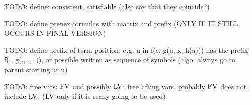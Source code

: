 TODO: define: consistent, satisfiable (also say that they coincide?)

TODO: define prenex formulas with matrix and prefix (ONLY IF IT STILL OCCURS IN FINAL VERSION)

TODO: define prefix of term position: e.g. u in f(c, g(u, x, h(a))) has the prefix f(., g(., ., .)), or possible written as sequence of symbols (algo: always go to parent starting at u)

TODO: free vars: $\operatorname{FV}$ and possibly $\operatorname{LV}$: free lifting vars. probably $\operatorname{FV}$ does not include $\operatorname{LV}$. ($\operatorname{LV}$ only if it is really going to be used)




